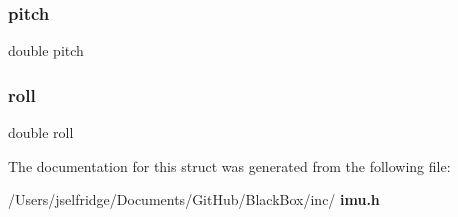 \mbox{\label{structimu__comp__struct_a34c057a0378030db67bd6a129f37d938}} 
\subsubsection{pitch}
{\footnotesize\ttfamily double pitch}

\mbox{\label{structimu__comp__struct_a1d3228afa3a1d6773954f40c1e519eb9}} 
\subsubsection{roll}
{\footnotesize\ttfamily double roll}



The documentation for this struct was generated from the following file\+:\begin{DoxyCompactItemize}
\item 
/\+Users/jselfridge/\+Documents/\+Git\+Hub/\+Black\+Box/inc/\textbf{ imu.\+h}\end{DoxyCompactItemize}
